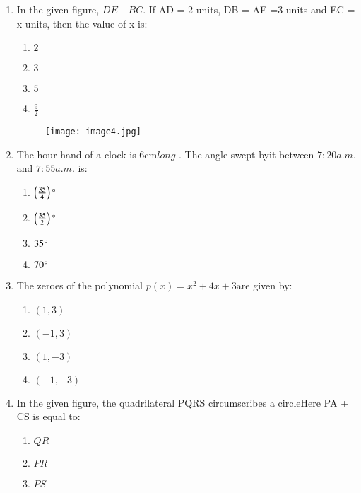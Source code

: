 \documentclass[12pt-letter paper]{article}
\providecommand{\brak}[1]{\ensuremath{\left(#1\right)}}
\begin{document}
\begin{enumerate}
\item In the given figure, $DE \parallel BC$. If AD = 2 units, DB = AE =3 units and EC = x units, then the value of x is:  
\begin{enumerate}
\item $ 2 $                                                          
\item $ 3 $                    
\item $ 5 $                                      
\item $ \frac{9}{2} $
\end{enumerate}
\newpage                                                                            
\begin{figure}[h!]
\centering                                            
\texttt{[image: image4.jpg]}    
\label{fig:enter-label}                                
\end{figure}
\item The hour-hand of a clock is $6\mathrm{cm}long$ . The angle swept byit between $7:20 a.m.$ and $7:55 a.m.$ is:
\begin{enumerate}
\item $ \left(\frac{35}{4}\right)\degree $
\item $ \left(\frac{35}{2}\right)\degree $                                
\item $ 35\degree $                  
\item $ 70\degree $  
\end{enumerate}
\item The zeroes of the polynomial $p\brak{x} = x ^ 2 + 4x + 3$are given by:
\begin{enumerate}                        
\item $ \brak{1,3} $                            
\item $ \brak{-1,3} $                
\item $ \brak{1,-3} $
\item $ \brak{-1,-3} $                                
\end{enumerate}                                                  
\item In the given figure, the quadrilateral PQRS circumscribes a circleHere PA + CS is equal to:  
\begin{enumerate}
\item $ QR $
\item $ PR $                                          
\item $ PS $                                          

\end{enumerate}
\end{enumerate}
\end{document}
